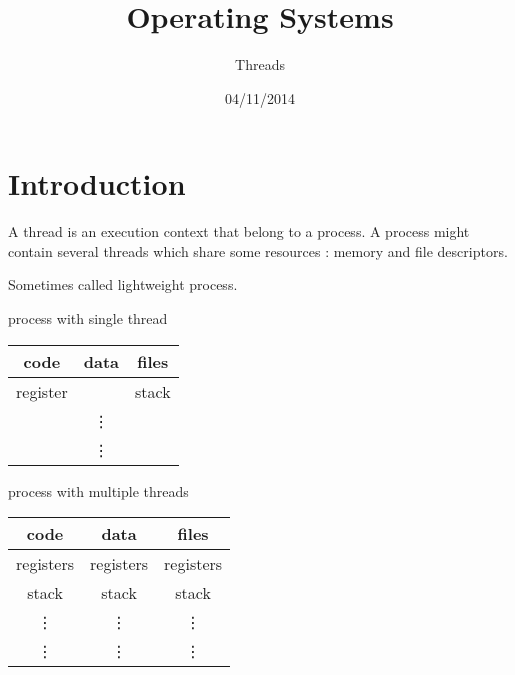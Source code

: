 \documentclass[a4paper,10pt]{article}
\title{Operating Systems}
\subtitle{Threads}
\author{}
\date{04/11/2014}
\begin{document}
\maketitle


\section{Introduction}

A thread is an execution context that belong to a process.
A process might contain several threads which share some resources : memory and file descriptors.

Sometimes called lightweight process.

\vspace{0.2cm}
\begin{minipage}{0.4\textwidth}
    \begin{center}
        process with single thread
        \begin{tabular}{|c|c|c|}
            \hline
            code & data & files \\
            \hline
            register & & stack \\
            & \vdots & \\
            & \vdots & \\
            \hline
        \end{tabular}
    \end{center}
\end{minipage}
\begin{minipage}{0.4\textwidth}
    \begin{center}
        process with multiple threads
        \begin{tabular}{|c|c|c|}
            \hline
            code & data & files \\
            \hline
            registers & registers & registers \\
            stack& stack & stack \\
            \vdots & \vdots & \vdots \\
            \vdots & \vdots & \vdots \\
            \hline
        \end{tabular}
    \end{center}
\end{minipage}
\vspace{0.2cm}
\end{document}

